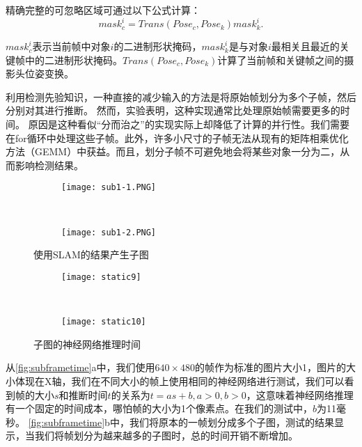 精确完整的可忽略区域可通过以下公式计算：
\begin{equation}\label{equ:mask}
mask_c^i = Trans(Pose_c,Pose_k)mask_k^i.
\end{equation} 

$mask_c^i$表示当前帧中对象$i$的二进制形状掩码，$mask_k^i$是与对象$i$最相关且最近的关键帧中的二进制形状掩码。$Trans(Pose_c, Pose_k)$计算了当前帧和关键帧之间的摄影头位姿变换。

利用检测先验知识，一种直接的减少输入的方法是将原始帧划分为多个子帧，然后分别对其进行推断。
然而，实验表明，这种实现通常比处理原始帧需要更多的时间。
原因是这种看似“分而治之”的实现实际上却降低了计算的并行性。我们需要在for循环中处理这些子帧。此外，许多小尺寸的子帧无法从现有的矩阵相乘优化方法（GEMM）中获益。而且，划分子帧不可避免地会将某些对象一分为二，从而影响检测结果。

\begin{figure}[htbp]
	\centering
	\begin{subfigure}{.45\linewidth}
		\texttt{[image: sub1-1.PNG]}
		\caption{}
	\end{subfigure}
	\ 
	\ 
	\ 
	\begin{subfigure}{.45\linewidth}
		\texttt{[image: sub1-2.PNG]}
		\caption{}
	\end{subfigure}
	\caption{使用SLAM的结果产生子图}\label{fig:NN for subgraph}
\end{figure}

\begin{figure}[htbp]
	\centering
	\begin{subfigure}{.48\linewidth}
		\texttt{[image: static9]}
		\caption{}
	\end{subfigure}
	\ 
	\begin{subfigure}{.48\linewidth}
		\texttt{[image: static10]}
		\caption{}
	\end{subfigure}
	\caption{子图的神经网络推理时间}\label{fig:subframetime}
\end{figure}

从\autoref{fig:subframetime}a中，我们使用$640\times 480$的帧作为标准的图片大小1，图片的大小体现在X轴，我们在不同大小的帧上使用相同的神经网络进行测试，我们可以看到帧的大小$s$和推断时间$t$的关系为$t = as + b, a>0,b >0$，这意味着神经网络推理有一个固定的时间成本，哪怕帧的大小为1个像素点。在我们的测试中，$b$为11毫秒。
\autoref{fig:subframetime}b中，我们将原本的一帧划分成多个子图，测试的结果显示，当我们将帧划分为越来越多的子图时，总的时间开销不断增加。

